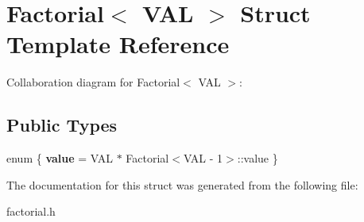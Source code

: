 \hypertarget{structFactorial}{\section{Factorial$<$ V\-A\-L $>$ Struct Template Reference}
\label{structFactorial}
}


Collaboration diagram for Factorial$<$ V\-A\-L $>$\-:
\subsection*{Public Types}
\begin{DoxyCompactItemize}
\item 
enum \{ {\bfseries value} =  V\-A\-L $\ast$ Factorial$<$V\-A\-L -\/ 1$>$\-:\-:value
 \}
\end{DoxyCompactItemize}


The documentation for this struct was generated from the following file\-:\begin{DoxyCompactItemize}
\item 
factorial.\-h\end{DoxyCompactItemize}
